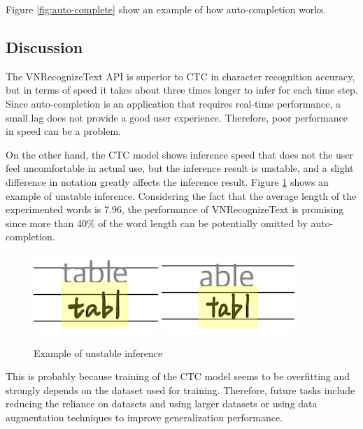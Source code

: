 Figure \ref{fig:auto-complete} show an example of how auto-completion works.

\subsection{Discussion}

The VNRecognizeText API is superior to CTC in character recognition accuracy,
but in terms of speed it takes about three times longer to infer for each time step.
Since auto-completion is an application that requires real-time performance,
a small lag does not provide a good user experience. Therefore,
poor performance in speed can be a problem.

On the other hand, the CTC model shows inference speed that does not the user
feel uncomfortable in actual use, but the inference result is unstable,
and a slight difference in notation greatly affects the inference result.
Figure \ref{fig:unstable} shows an example of unstable inference.
Considering the fact that the average length of the experimented words is 7.96,
the performance of VNRecognizeText is promising since more than 40\% of the word length
can be potentially omitted by auto-completion.

\begin{figure}
    \centering
    \includegraphics{images/table.png}
    \includegraphics{images/able.png}
    \caption{Example of unstable inference}
    \label{fig:unstable}
\end{figure}

This is probably because training of the CTC model seems to be overfitting
and strongly depends on the dataset used for training.
Therefore, future tasks include reducing the reliance on datasets and
using larger datasets or using data augmentation techniques to improve generalization performance.
